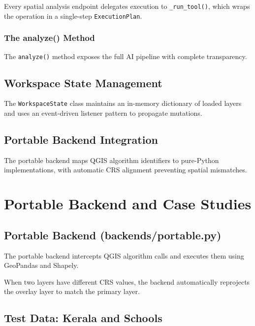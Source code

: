 \documentclass[12pt,a4paper]{report}
\begin{document}
Every spatial analysis endpoint delegates execution to \texttt{\_run\_tool()}, which wraps the operation in a single-step \texttt{ExecutionPlan}.

\subsection{The analyze() Method}

The \texttt{analyze()} method exposes the full AI pipeline with complete transparency.

\section{Workspace State Management}

The \texttt{WorkspaceState} class maintains an in-memory dictionary of loaded layers and uses an event-driven listener pattern to propagate mutations.

\section{Portable Backend Integration}

The portable backend maps QGIS algorithm identifiers to pure-Python implementations, with automatic CRS alignment preventing spatial mismatches.

\chapter{Portable Backend and Case Studies}

\section{Portable Backend (backends/portable.py)}

The portable backend intercepts QGIS algorithm calls and executes them using GeoPandas and Shapely.

When two layers have different CRS values, the backend automatically reprojects the overlay layer to match the primary layer.

\section{Test Data: Kerala and Schools}
\end{document}
